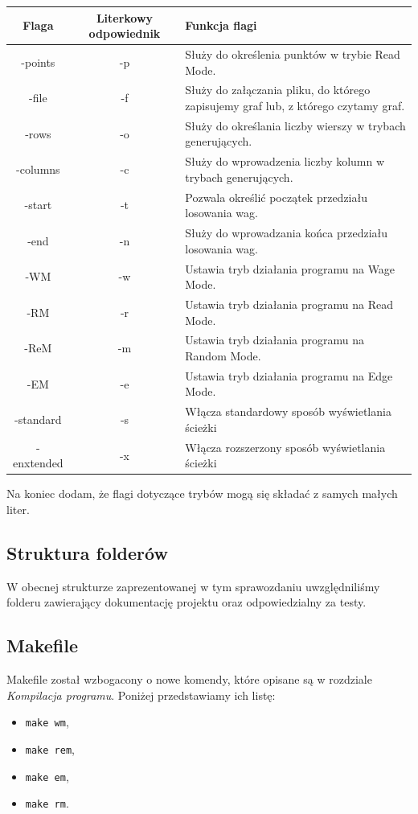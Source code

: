 \documentclass[10pt, a4paper]{report}
\begin{document}
    \begin{tabularx}{\textwidth}{ c|c|X }
        \hline Flaga & Literkowy odpowiednik & Funkcja flagi \\
        \hline -points & -p & Służy do określenia punktów w trybie Read Mode.\\
        \hline -file & -f & Służy do załączania pliku, do którego zapisujemy graf lub, z którego czytamy graf.\\
        \hline -rows & -o & Służy do określania liczby wierszy w trybach generujących.\\
        \hline -columns & -c & Służy do wprowadzenia liczby kolumn w trybach generujących.\\
        \hline -start & -t & Pozwala określić początek przedziału losowania wag.\\
        \hline -end & -n & Służy do wprowadzania końca przedziału losowania wag.\\
        \hline -WM & -w & Ustawia tryb działania programu na Wage Mode.\\
        \hline -RM & -r & Ustawia tryb działania programu na Read Mode.\\
        \hline -ReM & -m & Ustawia tryb działania programu na Random Mode.\\
        \hline -EM & -e & Ustawia tryb działania programu na Edge Mode.\\
        \hline -standard & -s & Włącza standardowy sposób wyświetlania ścieżki\\
        \hline -enxtended & -x & Włącza rozszerzony sposób wyświetlania ścieżki\\
        \hline
    \end{tabularx}
    \newline\newline Na koniec dodam, że flagi dotyczące trybów mogą się składać z samych małych liter.

    \subsection{Struktura folderów}
    W obecnej strukturze zaprezentowanej w tym sprawozdaniu uwzględniliśmy folderu zawierający dokumentację projektu oraz odpowiedzialny za testy.

    \subsection{Makefile}
    Makefile został wzbogacony o nowe komendy, które opisane są w rozdziale \textit{Kompilacja programu}. Poniżej przedstawiamy ich listę:
    \begin{itemize}
        \item \texttt{make wm},
        \item \texttt{make rem},
        \item \texttt{make em},
        \item \texttt{make rm}.
    \end{itemize}        
\end{document}
